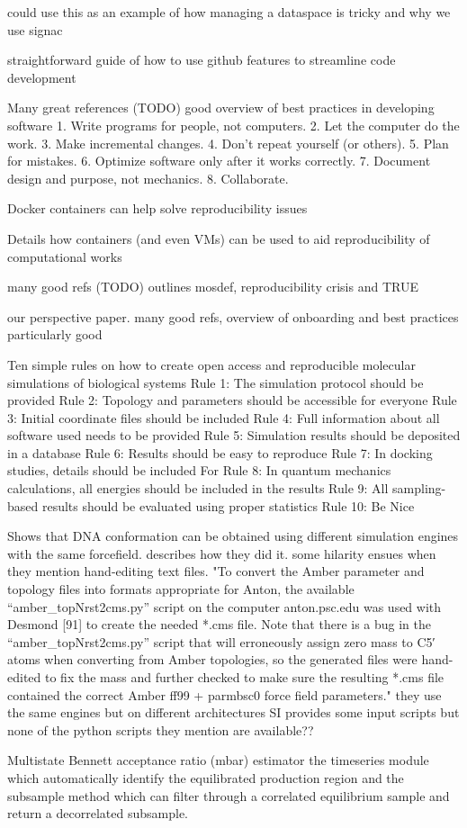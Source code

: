 \cite{Noble2009}
could use this as an example of how managing a dataspace is tricky and why we use signac

\cite{Sholler2019}
straightforward guide of how to use github features to streamline code development

\cite{Wilson2014}
Many great references (TODO) good overview of best practices in developing software
1. Write programs for people, not computers.
2. Let the computer do the work.
3. Make incremental changes.
4. Don’t repeat yourself (or others).
5. Plan for mistakes.
6. Optimize software only after it works correctly.
7. Document design and purpose, not mechanics.
8. Collaborate.

\cite{Cito2016}
Docker containers can help solve reproducibility issues

\cite{Shirts2008a}
Details how containers (and even VMs) can be used to aid reproducibility of computational works

\cite{Thompson2020}
many good refs (TODO) outlines mosdef, reproducibility crisis and TRUE

\cite{Jankowski2019}
our perspective paper. many good refs, overview of onboarding and best practices particularly good

\cite{Elofsson2019}
Ten simple rules on how to create open access and reproducible molecular simulations of biological systems
Rule 1: The simulation protocol should be provided
Rule 2: Topology and parameters should be accessible for everyone
Rule 3: Initial coordinate files should be included
Rule 4: Full information about all software used needs to be provided
Rule 5: Simulation results should be deposited in a database
Rule 6: Results should be easy to reproduce
Rule 7: In docking studies, details should be included For
Rule 8: In quantum mechanics calculations, all energies should be included in the results
Rule 9: All sampling-based results should be evaluated using proper statistics
Rule 10: Be Nice

\cite{Galindo-Murillo2015}
Shows that DNA conformation can be obtained using different simulation engines with the same forcefield.
describes how they did it.
some hilarity ensues when they mention hand-editing text files.
"To convert the Amber parameter and topology files into formats appropriate for Anton, the available “amber_topNrst2cms.py” script on the computer anton.psc.edu was used with Desmond [91] to create the needed *.cms file. Note that there is a bug in the “amber_topNrst2cms.py” script that will erroneously assign zero mass to C5′ atoms when converting from Amber topologies, so the generated files were hand-edited to fix the mass and further checked to make sure the resulting *.cms file contained the correct Amber ff99 + parmbsc0 force field parameters."
they use the same engines but on different architectures
SI provides some input scripts but none of the python scripts they mention are available??


\cite{Shirts2008a}
Multistate Bennett acceptance ratio (mbar) estimator 
the timeseries module which automatically identify the equilibrated production region and the subsample method which can filter through a correlated equilibrium sample and return a decorrelated subsample.

